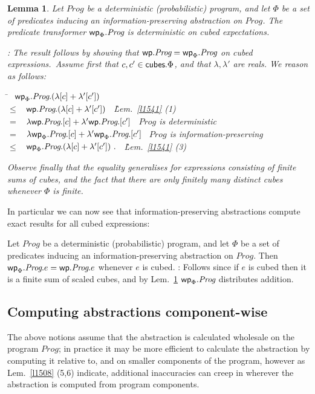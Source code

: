 \documentclass[numbers,copyright,creativecommons]{eptcs}
\newcommand{\cubes}{\mbox{\sf cubes}}
\newcommand{\Wp}{\mbox{\sf wp}}
\newcommand{\Prog}{\textit{Prog}}
\newtheorem{Lems}{Lemma} \newcommand{\Lem}[1]{Lem.~\ref{#1}}
\newcommand{\Proof}{\noindent{\bf Proof}: \quad}
\newenvironment{Reason}{\begin{tabbing}\hspace{4em}\=\kill}{\end{tabbing}\vspace{-2.5ex}}
\newcommand{\Step}[2]{#1 \> $\begin{array}[t]{ll}#2\end{array}$ \\}
\newcommand{\StepR}[3]{#1 \> $\begin{array}[t]{ll}#3\end{array}$ \` {\RF #2} \\}
\newcommand{\RF}{\small}
\begin{document}
\begin{Lems}\label{l0723}
Let $\Prog$ be a deterministic (probabilistic) program, and let $\Phi$ be a set of predicates inducing an information-preserving abstraction on $\Prog$. The predicate transformer $\Wp_\Phi.\Prog$ is deterministic on cubed expectations.

\Proof
The result follows by showing that $\Wp.\Prog = \Wp_\Phi.\Prog$ on cubed expressions.\ Assume first that $c, c' \in \cubes.\Phi$, and that $\lambda, \lambda'$ are reals. We reason as follows:

\begin{Reason}
\Step{}
{\Wp_\Phi.\Prog.(\lambda[c] + \lambda'[c'])}
\StepR{$\leq$}{\Lem{l1541} (1)}
{\Wp.\Prog.(\lambda[c] + \lambda'[c'])}
\StepR{$=$}{$\Prog$ is deterministic}
{\lambda\Wp.\Prog.[c] + \lambda'\Wp.\Prog.[c']}
\StepR{$=$}{$\Prog$ is information-preserving}
{\lambda\Wp_\Phi.\Prog.[c] + \lambda'\Wp_\Phi.\Prog.[c']}
\StepR{$\leq$}{\Lem{l1541} (3)}
{\Wp_\Phi.\Prog.(\lambda[c] + \lambda'[c'])~.}
\end{Reason}
Observe finally that the equality generalises for expressions consisting of finite sums of cubes, and the fact that there are only finitely many distinct cubes whenever $\Phi$ is finite.
\end{Lems}

In particular we can now see that information-preserving abstractions compute exact results for all cubed expressions:

\begin{Corl}\label{c1233}
Let $\Prog$ be a deterministic (probabilistic) program, and let $\Phi$ be a set of predicates inducing an information-preserving abstraction on $\Prog$. Then $\Wp_\Phi.\Prog.e = \Wp.\Prog.e$ whenever $e$ is cubed.
\Proof
Follows since if $e$ is cubed then it is a finite sum of scaled cubes, and by \Lem{l0723} $\Wp_\Phi.\Prog$ distributes addition.
\end{Corl}

\subsection{Computing abstractions component-wise}

The above notions assume that the abstraction is calculated wholesale on the program $\Prog$; in practice it may be more efficient to calculate the abstraction by computing it relative to, and on smaller components of the program, however as \Lem{l1508} (5,6) indicate, additional inaccuracies can creep in wherever the abstraction is computed from program components.
\end{document}
